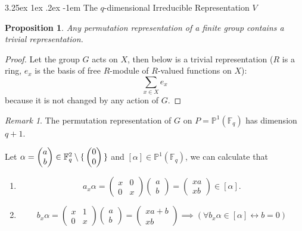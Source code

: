 \documentclass[12pt, letterpaper]{article}
\makeatletter
\newcommand{\field}{\mathbb{F}}
\newcommand{\ec}[1]{\left[{#1}\right]}
\newtheorem{prop}{Proposition}[section]
\renewcommand\paragraph{\@startsection{paragraph}{4}{\z@}%
	{3.25ex \@plus1ex \@minus.2ex}%
	{-1em}%
	{\normalfont\normalsize\bfseries}}
\theoremstyle{definition}
\theoremstyle{remark}
\newtheorem*{rem*}{Remark}
\theoremstyle{definition}
\theoremstyle{plain}
\numberwithin{equation}{section}
\makeatother
\begin{document}
	\paragraph{The $q$-dimensional Irreducible Representation $V$}
	\begin{prop}
		Any permutation representation of a finite group contains a trivial representation.
	\end{prop}
	\begin{proof}
		Let the group $G$ acts on $X$, then below is a trivial representation
		($R$ is a ring, $e_x$ is the basis of free $R$-module of $R$-valued functions on $X$):
		\[\sum_{x\in X}e_x\]
		because it is not changed by any action of $G$.
	\end{proof}

	\begin{rem*}
		The permutation representation of 
		$G$ on $P=\mathbb{P}^1(\field_q)$  has dimension $q + 1$.
		
		Let $\alpha=\begin{pmatrix}
				a\\b
			\end{pmatrix}\in \field_q^2\setminus\set{\begin{pmatrix}0\\0\end{pmatrix}}$
		and $\ec{\alpha}\in\mathbb{P}^1(\field_q)$, we can calculate that
		\begin{enumerate}
			\item \[ a_x\alpha=\begin{pmatrix}
							x&0\\0&x
						\end{pmatrix}\begin{pmatrix}
						a\\b
					\end{pmatrix}=\begin{pmatrix}
						xa\\xb
					\end{pmatrix}\in\ec{\alpha}. \]
				
			\item \[ b_x\alpha=\begin{pmatrix}
				x&1\\0&x
			\end{pmatrix}\begin{pmatrix}
				a\\b
			\end{pmatrix}=\begin{pmatrix}
				xa+b\\xb
			\end{pmatrix}\implies (\forall b_x\alpha\in\ec{\alpha}\leftrightarrow b=0) \]
		

\end{enumerate}
\end{rem*}
\end{document}
